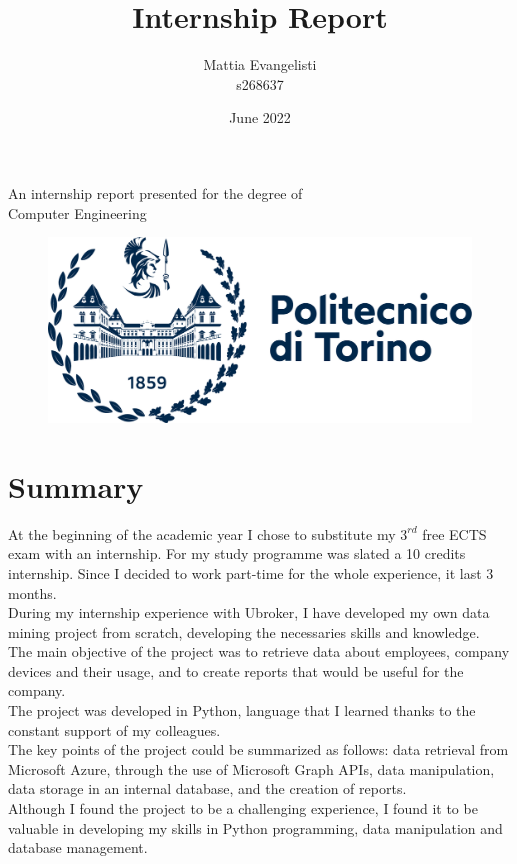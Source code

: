 \documentclass[12pt, a4paper, oneside]{article}
\title{\huge \textbf{Internship Report}}
\author{Mattia Evangelisti \\ s268637}
\date{June 2022}
\begin{document}
\begin{titlepage}
    \maketitle
    \thispagestyle{empty}
    \begin{center}
        An internship report presented for the degree of\\
        Computer Engineering \\
        \vspace{60pt}
        \begin{figure}[h]
            \centering
            \includegraphics[width=0.6\linewidth]{logo_poli.png}
        \end{figure}
    \end{center}
\end{titlepage}

\tableofcontents
\clearpage\null\newpage


\newpage
\section{Summary}
At the beginning of the academic year I chose to substitute my $3^{rd}$ free ECTS exam with an internship. For my study programme was slated a 10 credits internship. Since I decided to work part-time
for the whole experience, it last 3 months.\\
During my internship experience with Ubroker, I have developed my own data mining project from scratch, developing the necessaries skills and knowledge.\\
The main objective of the project was to retrieve data about employees, company devices and their usage, and to create reports that would be useful for the company.\\
The project was developed in Python, language that I learned thanks to the constant support of my colleagues.\\
The key points of the project could be summarized as follows: data retrieval from Microsoft Azure, through the use of Microsoft Graph APIs, data manipulation, data storage in an internal database,
and the creation of reports.\\
Although I found the project to be a challenging experience, I found it to be valuable in developing my skills in Python programming, data manipulation and database management.\\
\end{document}
